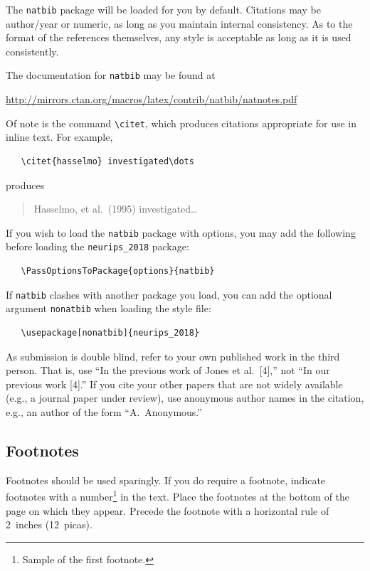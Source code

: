 \documentclass{article}
\begin{document}
The \verb+natbib+ package will be loaded for you by default.  Citations may be
author/year or numeric, as long as you maintain internal consistency.  As to the
format of the references themselves, any style is acceptable as long as it is
used consistently.

The documentation for \verb+natbib+ may be found at
\begin{center}
  \url{http://mirrors.ctan.org/macros/latex/contrib/natbib/natnotes.pdf}
\end{center}
Of note is the command \verb+\citet+, which produces citations appropriate for
use in inline text.  For example,
\begin{verbatim}
   \citet{hasselmo} investigated\dots
\end{verbatim}
produces
\begin{quote}
  Hasselmo, et al.\ (1995) investigated\dots
\end{quote}

If you wish to load the \verb+natbib+ package with options, you may add the
following before loading the \verb+neurips_2018+ package:
\begin{verbatim}
   \PassOptionsToPackage{options}{natbib}
\end{verbatim}

If \verb+natbib+ clashes with another package you load, you can add the optional
argument \verb+nonatbib+ when loading the style file:
\begin{verbatim}
   \usepackage[nonatbib]{neurips_2018}
\end{verbatim}

As submission is double blind, refer to your own published work in the third
person. That is, use ``In the previous work of Jones et al.\ [4],'' not ``In our
previous work [4].'' If you cite your other papers that are not widely available
(e.g., a journal paper under review), use anonymous author names in the
citation, e.g., an author of the form ``A.\ Anonymous.''

\subsection{Footnotes}

Footnotes should be used sparingly.  If you do require a footnote, indicate
footnotes with a number\footnote{Sample of the first footnote.} in the
text. Place the footnotes at the bottom of the page on which they appear.
Precede the footnote with a horizontal rule of 2~inches (12~picas).
\end{document}
